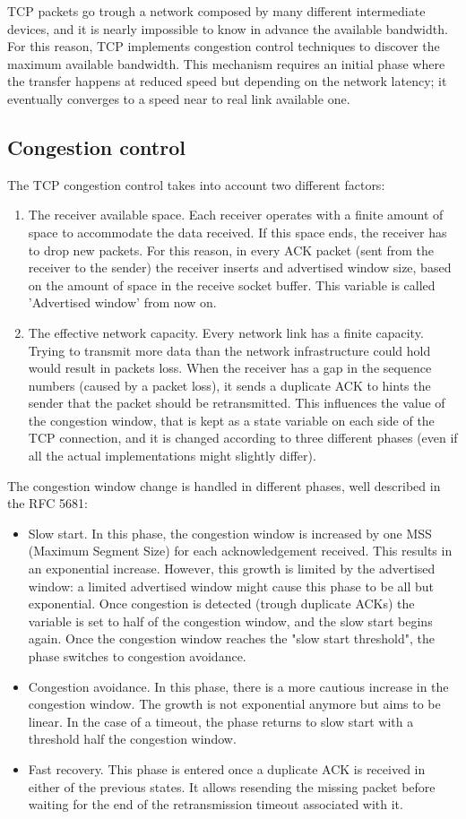 \documentclass[a4paper,10pt]{article}
\begin{document}
TCP packets go trough a network composed by many different intermediate devices, and it is nearly impossible to know in advance the available bandwidth. For this reason, TCP implements congestion control techniques to discover the maximum available bandwidth. This mechanism requires an initial phase where the transfer happens at reduced speed but depending on the network latency; it eventually converges to a speed near to real link available one.

\subsection{Congestion control}
The TCP congestion control takes into account two different factors: 
\begin{enumerate}
   \item The receiver available space. Each receiver operates with a finite amount of space to accommodate the data received. If this space ends, the receiver has to drop new packets. For this reason, in every ACK packet (sent from the receiver to the sender) the receiver inserts and advertised window size, based on the amount of space in the receive socket buffer. This variable is called 'Advertised window' from now on. 
   \item The effective network capacity. Every network link has a finite capacity. Trying to transmit more data than the network infrastructure could hold would result in packets loss. When the receiver has a gap in the sequence numbers (caused by a packet loss), it sends a duplicate ACK to hints the sender that the packet should be retransmitted. This influences the value of the congestion window, that is kept as a state variable on each side of the TCP connection, and it is changed according to three different phases (even if all the actual implementations might slightly differ).
\end{enumerate}
The congestion window change is handled in different phases, well described in the RFC 5681\cite{RFC_5681}:
\begin{itemize}
   \item Slow start. In this phase, the congestion window is increased by one MSS (Maximum Segment Size) for each acknowledgement received. This results in an exponential increase. However, this growth is limited by the advertised window: a limited advertised window might cause this phase to be all but exponential. Once congestion is detected (trough duplicate ACKs) the variable  is set to half of the congestion window, and the slow start begins again. Once the congestion window reaches the "slow start threshold", the phase switches to congestion avoidance.
   \item Congestion avoidance. In this phase, there is a more cautious increase in the congestion window. The growth is not exponential anymore but aims to be linear. In the case of a timeout, the phase returns to slow start with a threshold half the congestion window.
   \item Fast recovery. This phase is entered once a duplicate ACK is received in either of the previous states. It allows resending the missing packet before waiting for the end of the retransmission timeout associated with it.
\end{itemize}
\end{document}
